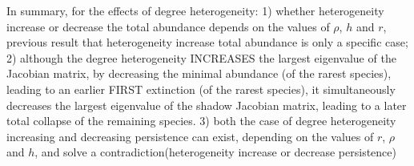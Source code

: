 \documentclass[a4paper,fleqn,12pt]{article}
\begin{document}

In summary,
for the effects of degree heterogeneity:
1) whether heterogeneity increase or decrease the total abundance depends on the values of $\rho$, $h$ and $r$, previous result that heterogeneity increase total abundance is only a specific case;
2) although the degree heterogeneity INCREASES the largest eigenvalue of the Jacobian matrix, by decreasing the minimal abundance (of the rarest species), leading to an earlier FIRST extinction (of the rarest species), it simultaneously decreases the largest eigenvalue of the shadow Jacobian matrix, leading to a later total collapse of the remaining species.
3) both the case of degree heterogeneity increasing and decreasing persistence can exist, depending on the values of $r$, $\rho$ and $h$, and solve a contradiction(heterogeneity increase or decrease persistence)
\end{document}

